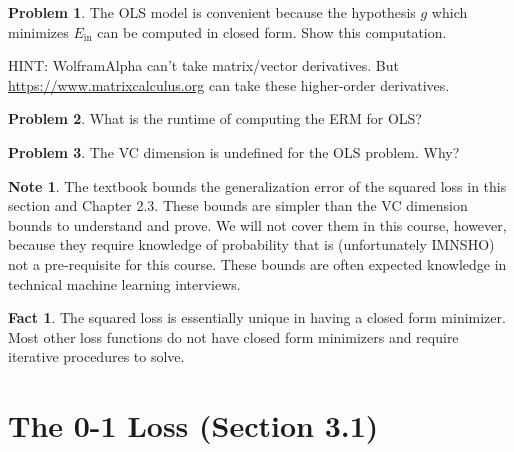 \documentclass[10pt]{exam}
\theoremstyle{definition}
\newtheorem{problem}{Problem}
\newtheorem{note}{Note}
\newtheorem{fact}{Fact}
\newcommand{\R}{\mathbb R}
\DeclareMathOperator*{\argmin}{arg\,min}
\newcommand{\Ein}{E_{\text{in}}}
\newcommand{\w}{\mathbf w}
\newcommand{\ltwo}[1]{{\lVert {#1} \rVert}_2}
\begin{document}

\newpage
\begin{problem}
    The OLS model is convenient because the hypothesis $g$ which minimizes $\Ein$ can be computed in closed form.
    Show this computation.

    HINT: WolframAlpha can't take matrix/vector derivatives.
    But \url{https://www.matrixcalculus.org} can take these higher-order derivatives.
\end{problem}

\newpage
\begin{problem}
    What is the runtime of computing the ERM for OLS?
\end{problem}

\vspace{4in}
\begin{problem}
    The VC dimension is undefined for the OLS problem.
    Why?
\end{problem}

\vspace{3in}
\begin{note}
    The textbook bounds the generalization error of the squared loss in this section and Chapter 2.3.
    These bounds are simpler than the VC dimension bounds to understand and prove.
    We will not cover them in this course, however,
    because they require knowledge of probability that is (unfortunately IMNSHO) not a pre-requisite for this course.
    These bounds are often expected knowledge in technical machine learning interviews.
\end{note}

\newpage
\begin{fact}
The squared loss is essentially unique in having a closed form minimizer.
Most other loss functions do not have closed form minimizers and require iterative procedures to solve.
\end{fact}

\section*{The 0-1 Loss (Section 3.1)}
\end{document}
